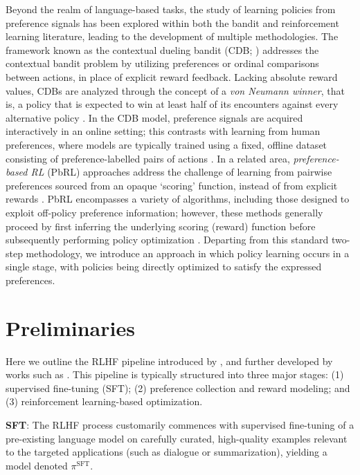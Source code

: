 Beyond the realm of language-based tasks, the study of learning policies from preference signals has been explored within both the bandit and reinforcement learning literature, leading to the development of multiple methodologies. The framework known as the contextual dueling bandit (CDB; \cite{yue2012karmed,dudik2015contextual}) addresses the contextual bandit problem by utilizing preferences or ordinal comparisons between actions, in place of explicit reward feedback. Lacking absolute reward values, CDBs are analyzed through the concept of a \textit{von Neumann winner}, that is, a policy that is expected to win at least half of its encounters against every alternative policy \citep{dudik2015contextual}. In the CDB model, preference signals are acquired interactively in an online setting; this contrasts with learning from human preferences, where models are typically trained using a fixed, offline dataset consisting of preference-labelled pairs of actions \citep{yan2022human}. In a related area, \textit{preference-based RL} (PbRL) approaches address the challenge of learning from pairwise preferences sourced from an opaque `scoring' function, instead of from explicit rewards \citep{BusaFekete2014,ruiz2023dueling}. PbRL encompasses a variety of algorithms, including those designed to exploit off-policy preference information; however, these methods generally proceed by first inferring the underlying scoring (reward) function before subsequently performing policy optimization \citep{jain2013learning,BusaFekete2014,christiano2017deep,sadigh2017active,kupcsik2018learning}. Departing from this standard two-step methodology, we introduce an approach in which policy learning occurs in a single stage, with policies being directly optimized to satisfy the expressed preferences.

\section{Preliminaries}\label{section:prelims}

Here we outline the RLHF pipeline introduced by \citeauthor{ziegler2020finetuning}, and further developed by works such as \citep{stiennon2022learning, bai2022training, ouyang2022training}. This pipeline is typically structured into three major stages: (1) supervised fine-tuning (SFT); (2) preference collection and reward modeling; and (3) reinforcement learning-based optimization.

\textbf{SFT}: The RLHF process customarily commences with supervised fine-tuning of a pre-existing language model on carefully curated, high-quality examples relevant to the targeted applications (such as dialogue or summarization), yielding a model denoted $\pi^\text{SFT}$.

